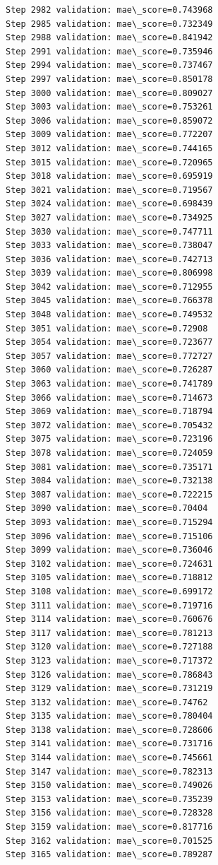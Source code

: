 \documentclass[11pt]{article}
\begin{document}
\begin{Verbatim}[commandchars=\\\{\}]
Step 2982 validation: mae\_score=0.743968
Step 2985 validation: mae\_score=0.732349
Step 2988 validation: mae\_score=0.841942
Step 2991 validation: mae\_score=0.735946
Step 2994 validation: mae\_score=0.737467
Step 2997 validation: mae\_score=0.850178
Step 3000 validation: mae\_score=0.809027
Step 3003 validation: mae\_score=0.753261
Step 3006 validation: mae\_score=0.859072
Step 3009 validation: mae\_score=0.772207
Step 3012 validation: mae\_score=0.744165
Step 3015 validation: mae\_score=0.720965
Step 3018 validation: mae\_score=0.695919
Step 3021 validation: mae\_score=0.719567
Step 3024 validation: mae\_score=0.698439
Step 3027 validation: mae\_score=0.734925
Step 3030 validation: mae\_score=0.747711
Step 3033 validation: mae\_score=0.738047
Step 3036 validation: mae\_score=0.742713
Step 3039 validation: mae\_score=0.806998
Step 3042 validation: mae\_score=0.712955
Step 3045 validation: mae\_score=0.766378
Step 3048 validation: mae\_score=0.749532
Step 3051 validation: mae\_score=0.72908
Step 3054 validation: mae\_score=0.723677
Step 3057 validation: mae\_score=0.772727
Step 3060 validation: mae\_score=0.726287
Step 3063 validation: mae\_score=0.741789
Step 3066 validation: mae\_score=0.714673
Step 3069 validation: mae\_score=0.718794
Step 3072 validation: mae\_score=0.705432
Step 3075 validation: mae\_score=0.723196
Step 3078 validation: mae\_score=0.724059
Step 3081 validation: mae\_score=0.735171
Step 3084 validation: mae\_score=0.732138
Step 3087 validation: mae\_score=0.722215
Step 3090 validation: mae\_score=0.70404
Step 3093 validation: mae\_score=0.715294
Step 3096 validation: mae\_score=0.715106
Step 3099 validation: mae\_score=0.736046
Step 3102 validation: mae\_score=0.724631
Step 3105 validation: mae\_score=0.718812
Step 3108 validation: mae\_score=0.699172
Step 3111 validation: mae\_score=0.719716
Step 3114 validation: mae\_score=0.760676
Step 3117 validation: mae\_score=0.781213
Step 3120 validation: mae\_score=0.727188
Step 3123 validation: mae\_score=0.717372
Step 3126 validation: mae\_score=0.786843
Step 3129 validation: mae\_score=0.731219
Step 3132 validation: mae\_score=0.74762
Step 3135 validation: mae\_score=0.780404
Step 3138 validation: mae\_score=0.728606
Step 3141 validation: mae\_score=0.731716
Step 3144 validation: mae\_score=0.745661
Step 3147 validation: mae\_score=0.782313
Step 3150 validation: mae\_score=0.749026
Step 3153 validation: mae\_score=0.735239
Step 3156 validation: mae\_score=0.728328
Step 3159 validation: mae\_score=0.817716
Step 3162 validation: mae\_score=0.701525
Step 3165 validation: mae\_score=0.789287

\end{Verbatim}
\end{document}
